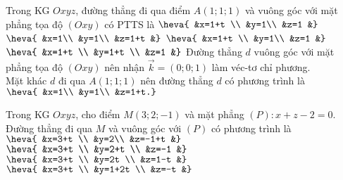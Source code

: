 \begin{ex}%
	Trong KG $Oxyz$, đường thẳng đi qua điểm $A(1; 1; 1)$ và vuông góc với mặt phẳng tọa độ $(Oxy)$ có PTTS là
	\choice
	{$\heva{	&x=1+t \\
			&y=1\\
			&z=1	&}$}
	{\True $\heva{	&x=1\\
			&y=1\\
			&z=1+t
			&}$}
	{$\heva{	&x=1+t \\
			&y=1\\
			&z=1	&}$}
	{$\heva{	&x=1+t \\
			&y=1+t \\
			&z=1	&}$}
	\loigiai
		{Đường thẳng $d$ vuông góc với mặt phẳng tọa độ $(Oxy)$ nên nhận $\overrightarrow{k}=(0; 0; 1)$ làm véc-tơ  chỉ phương.\\
		Mặt khác $d$ đi qua $A(1; 1; 1)$ nên đường thẳng $d$ có phương trình là $\heva{	&x=1\\
			&y=1\\
			&z=1+t.}$
		}
\end{ex}
\begin{ex}%
	Trong KG $Oxyz$, cho điểm $M(3; 2;-1)$ và mặt phẳng $(P)\colon x+z-2=0$. Đường thẳng đi qua $M$ và vuông góc với $(P)$ có phương trình là
	\choice
	{\True $\heva{	&x=3+t \\
			&y=2\\
			&z=-1+t
			&}$}
	{$\heva{	&x=3+t \\
			&y=2+t \\
			&z=-1	&}$}
	{$\heva{	&x=3+t \\
			&y=2t \\
			&z=1-t
			&}$}
	{$\heva{	&x=3+t \\
			&y=1+2t \\
			&z=-t
			&}$}
\end{ex}
